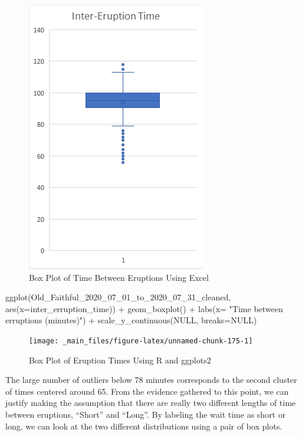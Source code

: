 \documentclass[
]{book}
\newenvironment{Shaded}{\begin{snugshade}}{\end{snugshade}}
\newcommand{\AttributeTok}[1]{\textcolor[rgb]{0.77,0.63,0.00}{#1}}
\newcommand{\ConstantTok}[1]{\textcolor[rgb]{0.00,0.00,0.00}{#1}}
\newcommand{\FunctionTok}[1]{\textcolor[rgb]{0.00,0.00,0.00}{#1}}
\newcommand{\NormalTok}[1]{#1}
\newcommand{\SpecialCharTok}[1]{\textcolor[rgb]{0.00,0.00,0.00}{#1}}
\newcommand{\StringTok}[1]{\textcolor[rgb]{0.31,0.60,0.02}{#1}}
\theoremstyle{definition}
\theoremstyle{definition}
\theoremstyle{definition}
\theoremstyle{definition}
\theoremstyle{remark}
\begin{document}
\begin{figure}

{\centering \includegraphics[width=0.3\linewidth]{data-examples/Old-Faithful/Eruption-Box-Excel} 

}

\caption{Box Plot of Time Between Eruptions Using Excel}\label{fig:unnamed-chunk-174}
\end{figure}

\begin{Shaded}
\begin{Highlighting}[]
\FunctionTok{ggplot}\NormalTok{(Old\_Faithful\_2020\_07\_01\_to\_2020\_07\_31\_cleaned, }\FunctionTok{aes}\NormalTok{(}\AttributeTok{x=}\NormalTok{inter\_erruption\_time)) }\SpecialCharTok{+} \FunctionTok{geom\_boxplot}\NormalTok{() }\SpecialCharTok{+} \FunctionTok{labs}\NormalTok{(}\AttributeTok{x=} \StringTok{"Time between erruptions (minutes)"}\NormalTok{) }\SpecialCharTok{+} \FunctionTok{scale\_y\_continuous}\NormalTok{(}\ConstantTok{NULL}\NormalTok{, }\AttributeTok{breaks=}\ConstantTok{NULL}\NormalTok{)}
\end{Highlighting}
\end{Shaded}

\begin{figure}

{\centering \texttt{[image: \_main\_files/figure-latex/unnamed-chunk-175-1]} 

}

\caption{Box Plot of Eruption Times Using R and ggplots2}\label{fig:unnamed-chunk-175}
\end{figure}

The large number of outliers below 78 minutes corresponds to the second cluster of times centered around 65. From the evidence gathered to this point, we can justify making the assumption that there are really two different lengths of time between eruptions, ``Short'' and ``Long''. By labeling the wait time as short or long, we can look at the two different distributions using a pair of box plots.
\end{document}

